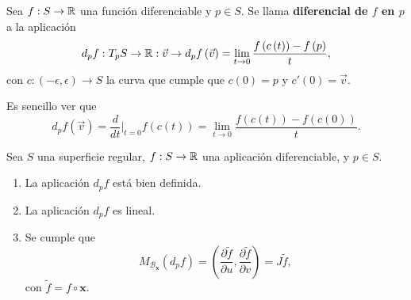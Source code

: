 \begin{definition}
Sea $\displaystyle f : S \to \mathbb{R} $ una función diferenciable y $\displaystyle p \in S $. Se llama \textbf{diferencial de $\displaystyle f $ en $\displaystyle p $} a la aplicación
\[d _{p}f : T_{p}S \to \mathbb{R} : \vec{v} \to d _{p}f\left(\vec{v}\right)= \lim_{t \to 0}\frac{f\left(c\left(t\right)\right)-f\left(p\right)}{t},\]
con $\displaystyle c : \left(-\epsilon , \epsilon \right)\to S $ la curva que cumple que $\displaystyle c\left(0\right)=p $ y $\displaystyle c'\left(0\right) = \vec{v} $.
\end{definition}
\begin{observation}
Es sencillo ver que 
	\[d _{p}f\left(\vec{v}\right)=\frac{d}{dt}|_{t = 0}f\left(c\left(t\right)\right) = \lim_{t \to 0}\frac{f\left(c\left(t\right)\right)-f\left(c\left(0\right)\right)}{t} .\]
\end{observation}
\begin{prop} Sea $\displaystyle S $ una superficie regular, $\displaystyle f : S \to \mathbb{R} $ una aplicación diferenciable, y $\displaystyle p \in S $. 
\begin{enumerate}
\item La aplicación $\displaystyle d _{p}f $ está bien definida. 
\item La aplicación $\displaystyle d _{p}f $ es lineal. 
\item Se cumple que 
	\[M_{ \mathcal{B}_{ \textbf{x} }}\left(d _{p}f\right)=\left(\frac{\partial \tilde{f}}{\partial u}, \frac{\partial \tilde{f}}{\partial v}\right)=J\tilde{f} ,\]
	con $\displaystyle \tilde{f} = f\circ \textbf{x}  $. 
\end{enumerate}
\end{prop}

